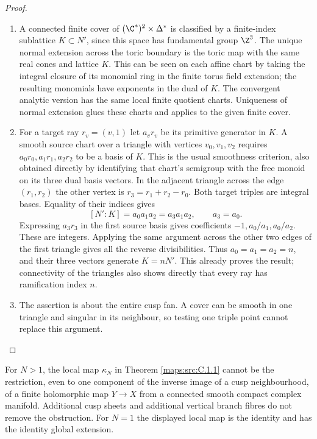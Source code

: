 \begin{proof}
\begin{enumerate}[label=\arabic*.,leftmargin=*]
\item A connected finite cover of $(\C^*)^2\times\Delta^*$ is classified by
a finite-index sublattice $K\subset N'$, since this space has fundamental
group $\Z^3$. The unique normal extension across the toric boundary is
the toric map with the same real cones and lattice $K$. This can be seen
on each affine chart by taking the integral closure of its monomial ring
in the finite torus field extension; the resulting monomials have
exponents in the dual of $K$. The convergent analytic version has the
same local finite quotient charts. Uniqueness of normal extension glues
these charts and applies to the given finite cover.

\item For a target ray $r_v=(v,1)$ let $a_vr_v$ be its primitive generator in
$K$. A smooth source chart over a triangle with vertices $v_0,v_1,v_2$
requires $a_0r_0,a_1r_1,a_2r_2$ to be a basis of $K$. This is the usual
smoothness criterion, also obtained directly by identifying that chart's
semigroup with the free monoid on its three dual basis vectors.
In the adjacent triangle across the edge $(r_1,r_2)$ the other vertex is
$r_3=r_1+r_2-r_0$. Both target triples are integral bases. Equality of
their indices gives
\[
 [N':K]=a_0a_1a_2=a_3a_1a_2,
 \qquad a_3=a_0.
\]
Expressing $a_3r_3$ in the first source basis gives coefficients
$-1,a_0/a_1,a_0/a_2$. These are integers. Applying the same argument
across the other two edges of the first triangle gives all the reverse
divisibilities. Thus $a_0=a_1=a_2=n$, and their three vectors generate
$K=nN'$. This already proves the result; connectivity of the triangles
also shows directly that every ray has ramification index $n$.

\item The assertion is about the entire cusp fan. A cover can be smooth in
one triangle and singular in its neighbour, so testing one triple point
cannot replace this argument.
\end{enumerate}
\end{proof}

\begin{theorem}\label{maps:src:C.1.3}


For $N>1$, the local map $\kappa_N$ in Theorem \ref{maps:src:C.1.1} cannot be the
restriction, even to one component of the inverse image of a cusp
neighbourhood, of a finite holomorphic map $Y\to X$ from a connected
smooth compact complex manifold. Additional cusp sheets and additional
vertical branch fibres do not remove the obstruction. For $N=1$ the
displayed local map is the identity and has the identity global extension.

\end{theorem}


